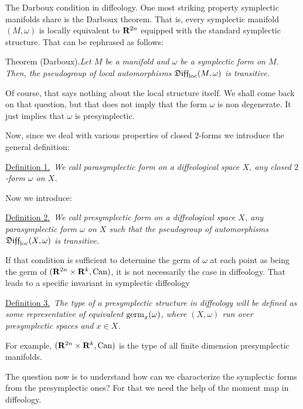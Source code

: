 \begin{Article}{The Darboux condition in diffeology.}
  One most striking property symplectic manifolds share is the Darboux theorem.
  That is,
  every symplectic manifold $(M,\omega)$ is locally equivalent to $\mathbf{R}^{2n}$ equipped with the standard symplectic structure.
  That can be rephrased as follows:
  
  \begin{Article}{Theorem (Darboux).}{\it Let $M$ be a manifold and $\omega$ be a symplectic form on $M$.
    Then,
    the pseudogroup of local automorphisms $\mathfrak{Diff}_{\mathrm{loc}}(M,\omega)$ is transitive.}
  \end{Article}
  
  Of course,
  that says nothing about the local structure itself.
  We shall come back on that question,
  but that does not imply that the form $\omega$ is non degenerate.
  It just implies that $\omega$ is presymplectic.
  
  Now, since we deal with various properties of closed $2$-forms we introduce the general definition:
  
  \uline{Definition 1.}~{\itshape We call \emph{parasymplectic form} on a diffeological space $X$,
  any closed $2$-form $\omega$ on $X$.}
  
  Now we introduce:
  
  \uline{Definition 2.}~{\itshape We call \emph{presymplectic form} on a diffeological space $X$,
  any parasymplectic form $\omega$ on $X$ such that the pseudogroup of automorphisms $\mathfrak{Diff}_{\mathrm{loc}}(X,\omega)$ is transitive.}
  
  If that condition is sufficient to determine the germ of $\omega$ at each point as being the germ of $(\mathbf{R}^{2n} \times \mathbf{R}^k, \operatorname{Can})$,
  it is not necessarily the case in diffeology.
  That leads to a specific invariant in symplectic diffeology
  
  \uline{Definition 3.}~{\itshape The \emph{type} of a presymplectic structure in diffeology will be defined as some representative of equivalent $\operatorname{germ}_x(\omega)$,
  where $(X,\omega)$ run over presymplectic spaces and $x \in X$.}
  
  For example,
  $(\mathbf{R}^{2n} \times \mathbf{R}^k, \operatorname{Can})$ is the type of all finite dimension presymplectic manifolds.
  
  The question now is to understand how can we characterize the symplectic forms from the presymplectic ones?
  For that we need the help of the moment map in diffeology.
\end{Article}

